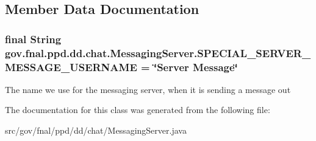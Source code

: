 \subsection{Member Data Documentation}
\hypertarget{classgov_1_1fnal_1_1ppd_1_1dd_1_1chat_1_1MessagingServer_a738da0a18944421491268d2220a3c7a4}{
\subsubsection[{S\-P\-E\-C\-I\-A\-L\-\_\-\-S\-E\-R\-V\-E\-R\-\_\-\-M\-E\-S\-S\-A\-G\-E\-\_\-\-U\-S\-E\-R\-N\-A\-M\-E}]{\setlength{\rightskip}{0pt plus 5cm}final String gov.\-fnal.\-ppd.\-dd.\-chat.\-Messaging\-Server.\-S\-P\-E\-C\-I\-A\-L\-\_\-\-S\-E\-R\-V\-E\-R\-\_\-\-M\-E\-S\-S\-A\-G\-E\-\_\-\-U\-S\-E\-R\-N\-A\-M\-E = \char`\"{}Server Message\char`\"{}\hspace{0.3cm}{\ttfamily [static]}}}\label{classgov_1_1fnal_1_1ppd_1_1dd_1_1chat_1_1MessagingServer_a738da0a18944421491268d2220a3c7a4}
The name we use for the messaging server, when it is sending a message out 

The documentation for this class was generated from the following file\-:\begin{DoxyCompactItemize}
\item 
src/gov/fnal/ppd/dd/chat/Messaging\-Server.\-java\end{DoxyCompactItemize}
